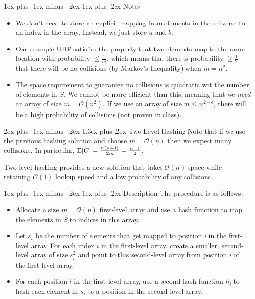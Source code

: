 \documentclass[11pt]{article}
\makeatletter
\renewcommand{\section}{\@startsection{section}{1}{0mm}%
                                 {2ex plus -1ex minus -.2ex}%
                                 {1.3ex plus .2ex}%
                                 {\normalfont\Large\bfseries}}%
\renewcommand{\subsection}{\@startsection{subsection}{2}{0mm}%
                                   {1ex plus -1ex minus -.2ex}%
                                   {1ex plus .2ex}%
                                   {\normalfont\large\bfseries}}%
\newcommand{\expc}{{\bf {\rm E}}}
\newcommand{\bigo}{\mathcal{O}}
\makeatother
\begin{document}
\subsection{Notes}
\begin{itemize}
    \item 
    We don't need to store an explicit mapping from elements in the universe to an index in the array. Instead, we just store $a$ and $b$.
    
    \item 
    Our example UHF satisfies the property that two elements map to the same location with probability $\leq \frac{1}{m}$, which means that there is probability $\geq \frac{1}{2}$ that there will be no collisions (by Markov's Inequality) when $m = n^2$.
    
    \item
    The space requirement to guarantee no collisions is quadratic wrt the number of elements in $S$. We cannot be more efficient than this, meaning that we \textit{need} an array of size $m = \bigo(n^2)$. If we use an array of size $m \leq n^{2-\epsilon}$, there will be a high probability of collisions (not proven in class).
    
\end{itemize}

\section{Two-Level Hashing}
Note that if we use the previous hashing solution and choose $m = \bigo(n)$ then we expect many collisions. In particular, $\expc[C] = \frac{n(n-1)}{2m} = \frac{n-1}{2}$. 

Two-level hashing provides a new solution that takes $\bigo(n)$ space while retaining $\bigo(1)$ lookup speed and a low probability of any collisions. 

\subsection{Description}
The procedure is as follows:
\begin{itemize}
    \item Allocate a size $m = \bigo(n)$ first-level array and use a hash function to map the elements in $S$ to indices in this array.
    \item Let $s_i$ be the number of elements that get mapped to position $i$ in the first-level array. For each index $i$ in the first-level array, create a smaller, second-level array of size $s_i^2$ and point to this second-level array from position $i$ of the first-level array.
    \item For each position $i$ in the first-level array, use a second hash function $h_i$ to hash each element in $s_i$ to a position in the second-level array.
\end{itemize}
\end{document}
